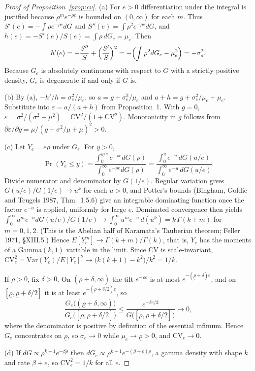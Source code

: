 \begin{proof}[Proof of Proposition~\ref{prop:cv}]
(a) For $e>0$ differentiation under the integral is justified because
$\rho^m e^{-\rho e}$ is bounded on $(0,\infty)$ for each $m$. Thus
$S'(e)=-\int\rho e^{-\rho e}dG$ and $S''(e)=\int\rho^2e^{-\rho e}dG$, and
$h(e)=-S'(e)/S(e)=\int\rho\,dG_e=\mu_e$. Then
\[
  h'(e)=-\frac{S''}{S}+\Bigl(\frac{S'}{S}\Bigr)^2
       =-\Bigl(\int\rho^2dG_e-\mu_e^2\Bigr)=-\sigma_e^2 .
\]
Because $G_e$ is absolutely continuous with respect to $G$ with a strictly positive
density, $G_e$ is degenerate if and only if $G$ is.

(b) By (a), $-h'/h=\sigma_e^2/\mu_e$, so $a=g+\sigma_e^2/\mu_e$ and
$a+h=g+\sigma_e^2/\mu_e+\mu_e$. Substitute into $\varepsilon=a/(a+h)$ from
Proposition~1. With $g=0$,
$\varepsilon=\sigma^2/(\sigma^2+\mu^2)=\mathrm{CV}^2/(1+\mathrm{CV}^2)$.
Monotonicity in $g$ follows from $\partial\varepsilon/\partial g
=\mu/(g+\sigma^2/\mu+\mu)^2>0$.

(c) Let $Y_e=e\rho$ under $G_e$. For $y>0$,
\[
  \Pr(Y_e\le y)=\frac{\int_0^{y/e}e^{-\rho e}dG(\rho)}{\int_0^\infty e^{-\rho e}dG(\rho)}
  =\frac{\int_0^{y}e^{-u}\,dG(u/e)}{\int_0^\infty e^{-u}\,dG(u/e)} .
\]
Divide numerator and denominator by $G(1/e)$. Regular variation gives
$G(u/e)/G(1/e)\to u^{k}$ for each $u>0$, and Potter's bounds
(Bingham, Goldie and Teugels 1987, Thm.~1.5.6) give an integrable dominating function
once the factor $e^{-u}$ is applied, uniformly for large $e$. Dominated convergence then yields
$\int_0^\infty u^m e^{-u}dG(u/e)/G(1/e)\to\int_0^\infty u^m e^{-u}\,d(u^k)
=k\,\Gamma(k+m)$ for $m=0,1,2$. (This is the Abelian half of Karamata's Tauberian
theorem; Feller 1971, \S XIII.5.) Hence $E[Y_e^m]\to\Gamma(k+m)/\Gamma(k)$, that is,
$Y_e$ has the moments of a Gamma$(k,1)$ variable in the limit. Since $\mathrm{CV}$ is
scale-invariant, $\mathrm{CV}_e^2=\mathrm{Var}(Y_e)/E[Y_e]^2\to
\bigl(k(k+1)-k^2\bigr)/k^2=1/k$.

If $\underline\rho>0$, fix $\delta>0$. On $(\underline\rho+\delta,\infty)$ the tilt
$e^{-\rho e}$ is at most $e^{-(\underline\rho+\delta)e}$, and on
$[\underline\rho,\underline\rho+\delta/2]$ it is at least $e^{-(\underline\rho+\delta/2)e}$, so
\[
  \frac{G_e\bigl((\underline\rho+\delta,\infty)\bigr)}
       {G_e\bigl([\underline\rho,\underline\rho+\delta/2]\bigr)}
  \le\frac{e^{-\delta e/2}}{G\bigl([\underline\rho,\underline\rho+\delta/2]\bigr)}\to0,
\]
where the denominator is positive by definition of the essential infimum. Hence $G_e$
concentrates on $\underline\rho$, so $\sigma_e\to0$ while $\mu_e\to\underline\rho>0$, and
$\mathrm{CV}_e\to0$.

(d) If $dG\propto\rho^{k-1}e^{-\beta\rho}$ then
$dG_e\propto\rho^{k-1}e^{-(\beta+e)\rho}$, a gamma density with shape $k$ and rate
$\beta+e$, so $\mathrm{CV}_e^2=1/k$ for all $e$.
\end{proof}

